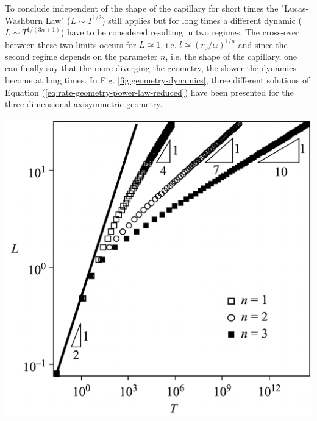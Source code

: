 \documentclass[aip, amsmath, amssymb, reprint, twocolumn, floatfix]{revtex4-1}
\begin{document}
To conclude independent of the shape of the capillary for short times the "Lucas-Washburn Law" ($L \sim T^{1/2}$) still applies but for long times a different dynamic ($L \sim T^{1/(3n+1)}$) have to be considered resulting in two regimes. The cross-over between these two limits occurs for $L \simeq 1$, i.e. $l \simeq (r_0/\alpha)^{1/n}$ and since the second regime depends on the parameter $n$, i.e. the shape of the capillary, one can finally say that the more diverging the geometry, the slower the dynamics become at long times.  In Fig. \ref{fig:geometry-dynamics}, three different solutions of Equation (\ref{eq:rate-geometry-power-law-reduced}) have been presented for the three-dimensional axisymmetric geometry.
\begin{center}
	\captionsetup{type=figure}
	\includegraphics[width = \linewidth]{../pictures/Geometry-Dynamics.png}
	\label{fig:geometry-dynamics}
\end{center}


\end{document}
